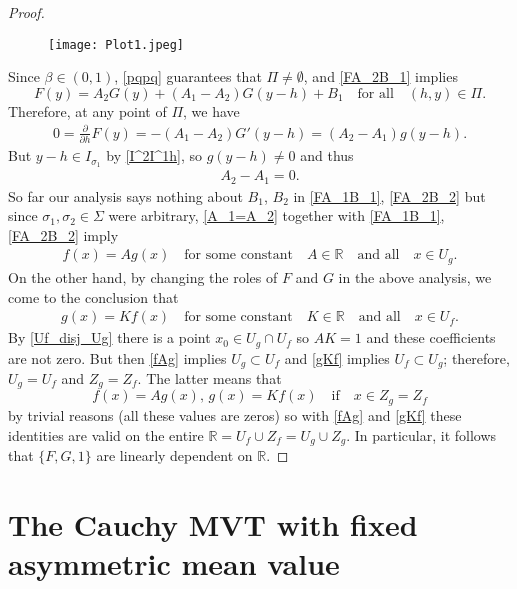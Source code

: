 \documentclass{birkjour}
\begin{document}
\begin{proof}
\begin{figure}[h!]
  \caption{}
  \centering
    \texttt{[image: Plot1.jpeg]}
\end{figure}

\smallskip
\noindent
Since $\beta\in(0,1)$, \eqref{pqpq} guarantees that $\Pi\neq\emptyset$, 
and \eqref{FA_2B_1} implies 
\begin{equation*}
F(y)= A_2G(y)+(A_1-A_2)G(y-h)+B_1 \quad \text{for all} \quad (h,y)\in\Pi.
\end{equation*}
Therefore, at any point of $\Pi$, we have
\begin{align*}
0=\frac{\partial}{\partial h}F(y) = -(A_1-A_2)G'(y-h) = (A_2-A_1)g(y-h).
\end{align*}
But $y-h\in I_{\sigma_1}$ by \eqref{I^2I^1h}, so $g(y-h)\neq 0$ and thus
\begin{align}\label{A_1=A_2}
A_2-A_1=0.
\end{align}
So far our analysis says nothing about $B_1$, $B_2$ in \eqref{FA_1B_1}, \eqref{FA_2B_2} but since $\sigma_1, \sigma_2\in\Sigma$ were arbitrary, \eqref{A_1=A_2} together with \eqref{FA_1B_1}, \eqref{FA_2B_2} imply 
\begin{align}\label{fAg}
f(x)=Ag(x) \quad \text{for some constant} \quad A\in{{\mathbb R}} \quad \text{and all} \quad x\in U_g.
\end{align}
On the other hand, by changing the roles of $F$ and $G$ in the above analysis, we come to the conclusion that 
\begin{align}\label{gKf}
g(x)=Kf(x) \quad \text{for some constant} \quad K\in{{\mathbb R}} \quad \text{and all} \quad x\in U_f.
\end{align}
By \eqref{Uf_disj_Ug} there is a point $x_0\in U_g\cap U_f$ so $AK=1$ and these coefficients are not zero. But then \eqref{fAg} implies  $U_g\subset U_f$ and \eqref{gKf} implies $U_f\subset U_g$; therefore, $U_g=U_f$ and $Z_g=Z_f$. The latter means that 
\[
f(x)=Ag(x), \, g(x)=Kf(x) \quad \text{if} \quad x\in Z_g=Z_f
\]
by trivial reasons (all these values are zeros) so with \eqref{fAg} and \eqref{gKf} these identities are valid on the entire ${{\mathbb R}}=U_f\cup Z_f=U_g\cup Z_g$. 
In particular, it follows that $\{F, G, 1\}$ are linearly dependent on ${{\mathbb R}}$.
\end{proof}

\section{The Cauchy MVT with fixed asymmetric mean value}
\end{document}
